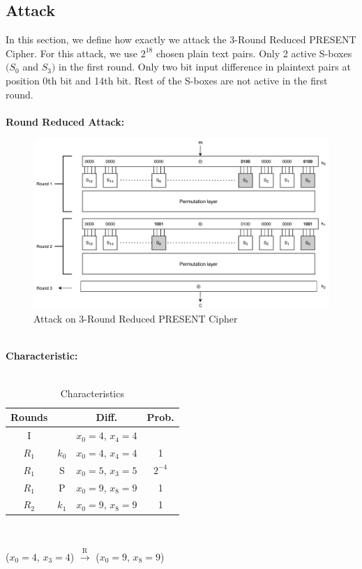 \documentclass[journal=tosc,preprint]{iacrtrans}
\begin{document}
\subsection{Attack}
In this section, we define how exactly we attack the 3-Round Reduced PRESENT Cipher.
For this attack, we use $2^{18}$ chosen plain text pairs. Only 2 active S-boxes $(S_0 $ and $S_3)$ in the first round. Only two bit input difference in plaintext pairs at position 0th bit and 14th bit. Rest of the S-boxes are not active in the first round. \\\\
\textbf{Round Reduced Attack:}\\
\begin{figure}[h!]
	\centering
	\includegraphics[width=0.9\linewidth, height=0.3\textheight]{DC1}
	\caption{Attack on 3-Round Reduced PRESENT Cipher}
	\label{fig:dc1}
\end{figure}\\
\textbf{Characteristic:}\\\\
\begin{table}[h!]
	\caption{Characteristics}
	\centering
	\begin{tabular}{ |c||c|c|c| }
		\hline
		Rounds & & Diff. & Prob. \\ \hline \hline
		I& & $x_0 = 4$, $x_4 = 4$ &  \\ 
		$R_1$& $k_0$ & $x_0 = 4$, $x_4 = 4$ & 1 \\
		$R_1$& S & $x_0 = 5$, $x_{3} = 5$ & $2^{-4}$ \\
		$R_1$& P & $x_0 = 9$, $x_{8} = 9$ & 1 \\
		$R_2$& $k_1$ & $x_0 = 9$, $x_{8} = 9$ & 1 \\ \hline
	\end{tabular}\\
\end{table}
	($x_0 = 4$, $x_3 = 4$) $\xrightarrow[]{\text{R}}$ ($x_0 = 9$, $x_8 = 9$)\\\\
\end{document}
